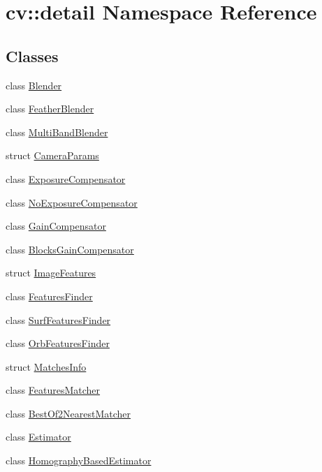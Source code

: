 \hypertarget{namespacecv_1_1detail}{\section{cv\-:\-:detail Namespace Reference}
\label{namespacecv_1_1detail}
}
\subsection*{Classes}
\begin{DoxyCompactItemize}
\item 
class \hyperlink{classcv_1_1detail_1_1Blender}{Blender}
\item 
class \hyperlink{classcv_1_1detail_1_1FeatherBlender}{Feather\-Blender}
\item 
class \hyperlink{classcv_1_1detail_1_1MultiBandBlender}{Multi\-Band\-Blender}
\item 
struct \hyperlink{structcv_1_1detail_1_1CameraParams}{Camera\-Params}
\item 
class \hyperlink{classcv_1_1detail_1_1ExposureCompensator}{Exposure\-Compensator}
\item 
class \hyperlink{classcv_1_1detail_1_1NoExposureCompensator}{No\-Exposure\-Compensator}
\item 
class \hyperlink{classcv_1_1detail_1_1GainCompensator}{Gain\-Compensator}
\item 
class \hyperlink{classcv_1_1detail_1_1BlocksGainCompensator}{Blocks\-Gain\-Compensator}
\item 
struct \hyperlink{structcv_1_1detail_1_1ImageFeatures}{Image\-Features}
\item 
class \hyperlink{classcv_1_1detail_1_1FeaturesFinder}{Features\-Finder}
\item 
class \hyperlink{classcv_1_1detail_1_1SurfFeaturesFinder}{Surf\-Features\-Finder}
\item 
class \hyperlink{classcv_1_1detail_1_1OrbFeaturesFinder}{Orb\-Features\-Finder}
\item 
struct \hyperlink{structcv_1_1detail_1_1MatchesInfo}{Matches\-Info}
\item 
class \hyperlink{classcv_1_1detail_1_1FeaturesMatcher}{Features\-Matcher}
\item 
class \hyperlink{classcv_1_1detail_1_1BestOf2NearestMatcher}{Best\-Of2\-Nearest\-Matcher}
\item 
class \hyperlink{classcv_1_1detail_1_1Estimator}{Estimator}
\item 
class \hyperlink{classcv_1_1detail_1_1HomographyBasedEstimator}{Homography\-Based\-Estimator}

\end{DoxyCompactItemize}
